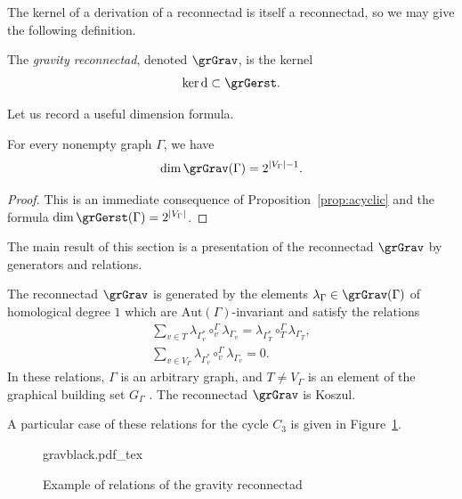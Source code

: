 The kernel of a derivation of a reconnectad is itself a reconnectad, so we may give the following definition.

\begin{defi}
The \emph{gravity reconnectad}, denoted $\grGrav$, is the kernel 
 \[
\ker \mathrm{d} \subset \grGerst.
 \]
\end{defi}

Let us record a useful dimension formula.

\begin{prop}\label{prop:gravdim}
For every nonempty graph $\Gamma$, we have
\[
\dim \grGrav(\Gamma) = 2^{|V_\Gamma|-1}.
\]
\end{prop}

\begin{proof}
This is an immediate consequence of Proposition~\ref{prop:acyclic} and the formula $\dim \grGerst(\Gamma) = 2^{|V_\Gamma|}$.
\end{proof}

The main result of this section is a presentation of the reconnectad $\grGrav$ by generators and relations. 

\begin{theorem}\label{th:gravpresent}
The reconnectad $\grGrav$ is generated by the elements $\lambda_{\Gamma} \in \grGrav(\Gamma)$ of homological degree $1$ which are $\mathrm{Aut}(\Gamma)$-invariant and satisfy the relations
\begin{gather}
\sum_{v \in T} \lambda_{\Gamma^*_v} \circ_v^{\Gamma} \lambda_{\Gamma_v} = \lambda_{\Gamma^*_T}\circ_T^{\Gamma} \lambda_{\Gamma_T},\label{eq:grav1} \\
    \sum_{v \in V_\Gamma}  \lambda_{\Gamma^*_v} \circ_v^{\Gamma} \lambda_{\Gamma_v} = 0 .\label{eq:grav2}
\end{gather}
In these relations, $\Gamma$ is an arbitrary graph, and $T\ne V_\Gamma$ is an element of the graphical building set $G_\Gamma$ . The reconnectad $\grGrav$ is Koszul.
\end{theorem}

A particular case of these relations for the cycle $C_3$ is given in Figure~\ref{fig:gravrel}.
\begin{figure}[ht]
    \centering
    \def\svgwidth{0.7\columnwidth}
    {gravblack.pdf_tex}
    \caption{Example of relations of the gravity reconnectad}
    \label{fig:gravrel}
\end{figure}

